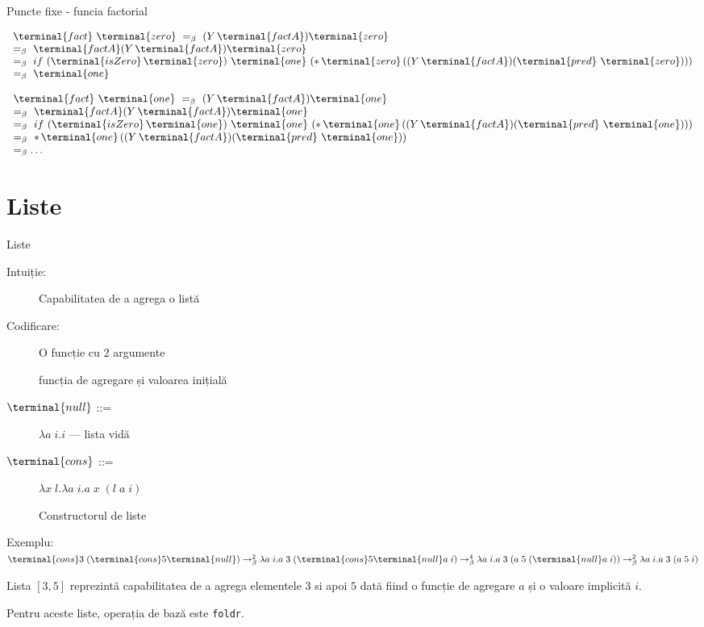 \documentclass[xcolor=pdftex,romanian,colorlinks]{beamer}
\newcommand{\Snull}{\terminal{null}}
\newcommand{\Scons}{\terminal{cons}}
\begin{document}
\begin{frame}[fragile]{Puncte fixe - func\ts ia factorial}

$\begin{array}{l}
\terminal{fact}\,\,  \terminal{zero}  \,\,=_\beta \,\,(Y\, \terminal{factA}) \terminal{zero}\\
 =_\beta \,\,\terminal{factA} (Y\, \terminal{factA}) \terminal{zero}\\
 =_\beta \,\, if\,\, (\terminal{isZero}\,\terminal{zero})\,\, \terminal{one}\,\, (*\, \terminal{zero}\, ((Y\,\terminal{factA}) (\terminal{pred} \,\,\terminal{zero})))\\
 =_\beta \,\,\terminal{one}
\end{array}$    \pause
\medskip

$\begin{array}{l}
\terminal{fact}\,\,  \terminal{one}  \,\,=_\beta \,\,(Y\, \terminal{factA}) \terminal{one}\\
 =_\beta \,\,\terminal{factA} (Y\, \terminal{factA}) \terminal{one}\\
 =_\beta \,\, if\,\, (\terminal{isZero}\,\terminal{one})\,\, \terminal{one}\,\, (*\, \terminal{one}\, ((Y\,\terminal{factA}) (\terminal{pred} \,\,\terminal{one})))\\
 =_\beta \,\, *\, \terminal{one}\, ((Y\,\terminal{factA}) (\terminal{pred} \,\,\terminal{one}))\\
 =_\beta \ldots
\end{array}$
\end{frame}

\section{Liste}
\begin{frame}{Liste}

  \begin{description}
    \item[Intuiție:] Capabilitatea de a agrega o listă
    \item[Codificare:] O funcție cu 2 argumente 
         
        funcția de agregare și valoarea inițială
    \item[$\Snull$ ::=] $\lambda a\; i.i$ --- lista vidă
    \item[$\Scons$ ::=] $\lambda x\; l.\lambda a\; i.a\; x\; (l\; a\; i)$

    Constructorul de liste

  \end{description}
    \begin{block}{Exemplu: $\Scons 3\; (\Scons 5 \Snull) \rightarrow^2_\beta
      \lambda a\; i.a\; 3\; (\Scons 5 \Snull a\; i) \rightarrow^4_\beta
      \lambda a\; i.a\; 3\; (a\; 5\; (\Snull a\; i)) \rightarrow^2_\beta
      \lambda a\; i.a\; 3\; (a\; 5\; i)
      $}
    
    Lista $[3, 5]$
    reprezintă capabilitatea de a agrega elementele $3$ si apoi $5$ dată
    fiind o funcție de agregare $a$ și o valoare implicită $i$.

    Pentru aceste liste, operația de bază este \texttt{foldr}.
    \end{block}
\end{frame}
\end{document}
